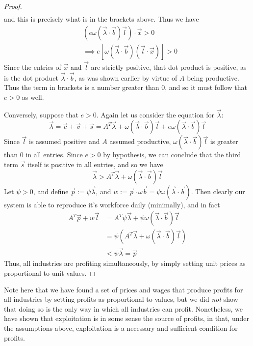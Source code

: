 \begin{proof}
\begin{align*}
 \end{align*}
and this is precisely what is in the brackets above. Thus we have
\begin{align*}
	& (e\omega(\vec{\lambda}\cdot\vec{b})\vec{l})\cdot\vec{x} > 0 \\
	&\implies e[\omega(\vec{\lambda}\cdot\vec{b})(\vec{l}\cdot\vec{x})] > 0
\end{align*}
Since the entries of $\vec{x}$ and $\vec{l}$ are strictly positive, that dot product is positive, as is the dot product $\vec{\lambda} \cdot \vec{b}$, as was shown earlier by virtue of $A$ being productive. Thus the term in brackets is a number greater than $0$, and so it must follow that $e > 0$ as well. \par 
Conversely, suppose that $e > 0$. Again let us consider the equation for $\vec{\lambda}$:
\[ \vec{\lambda} = \vec{c} + \vec{v} + \vec{s} = A^T\vec{\lambda} + \omega(\vec{\lambda}\cdot\vec{b})\vec{l} + e\omega(\vec{\lambda}\cdot\vec{b})\vec{l} \]
Since $\vec{l}$ is assumed positive and $A$ assumed productive, $\omega(\vec{\lambda}\cdot\vec{b})\vec{l}$ is greater than $0$ in all entries. Since $e > 0$ by hypothesis, we can conclude that the third term $\vec{s}$ itself is positive in all entries, and so we have
\[ \vec{\lambda} > A^T\vec{\lambda} + \omega(\vec{\lambda}\cdot\vec{b})\vec{l} \]
Let $\psi > 0$, and define $\vec{p} := \psi\vec{\lambda}$, and $w := \vec{p}\cdot \omega\vec{b} = \psi\omega(\vec{\lambda}\cdot\vec{b})$. Then clearly our system is able to reproduce it's workforce daily (minimally), and in fact 
\begin{align*}
	A^T\vec{p} + w\vec{l} &= A^T\psi\vec{\lambda} + \psi\omega(\vec{\lambda}\cdot\vec{b})\vec{l} \\
	&= \psi(A^T\vec{\lambda} + \omega(\vec{\lambda}\cdot\vec{b})\vec{l}) \\
	&< \psi\vec{\lambda} = \vec{p}
\end{align*}
Thus, all industries are profiting simultaneously, by simply setting unit prices as proportional to unit values. 
\end{proof}
Note here that we have found a set of prices and wages that produce profits for all industries by setting profits as proportional to values, but we did \textit{not} show that doing so is the only way in which all industries can profit. Nonetheless, we have shown that exploitation is in some sense the source of profits, in that, under the assumptions above, exploitation is a necessary and sufficient condition for profits. \par 
